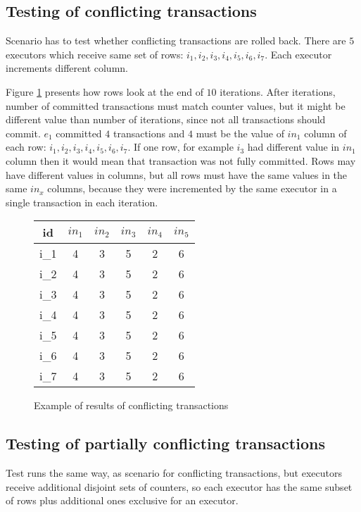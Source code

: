\subsection{Testing of conflicting transactions}
Scenario has to test whether conflicting transactions are rolled back. 
There are $5$ executors which receive same set of rows: $i_1, i_2, i_3, i_4, i_5, i_6, i_7$. Each executor increments different column. 

Figure \ref{fig:exampleConflictingTransactions} presents how rows look at the end of $10$ iterations.
After iterations, number of committed transactions must match counter values, but it might be different value than number of iterations, since not all transactions should commit. $e_1$ committed $4$ transactions and $4$ must be the value of $in_1$ column of each row: $i_1, i_2, i_3, i_4, i_5, i_6, i_7$. If one row, for example $i_3$ had different value in $in_1$ column then it would mean that transaction was not fully committed.
Rows may have different values in columns, but all rows must have the same values in the same $in_{x}$ columns, because they were incremented by the same executor in a single transaction in each iteration.


\begin{figure}[h]
\centering
\begin{tabular}{c||c|c|c|c|c}
        \toprule
        id & $in_{1}$ & $in_{2}$ & $in_{3}$ & $in_{4}$ & $in_{5}$ \\ \midrule
        i_1 &   4        & 3        & 5        &  2       & 6        \\
        i_2 &   4        & 3        & 5        &  2       & 6         \\ 
        i_3 &   4        & 3        & 5        &  2       & 6         \\ 
        i_4 &   4        & 3        & 5        &  2       & 6         \\ 
        i_5 &   4        & 3        & 5        &  2       & 6         \\ 
        i_6 &   4        & 3        & 5        &  2       & 6         \\ 
        i_7 &   4        & 3        & 5        &  2       & 6         \\  \bottomrule
      \end{tabular}
      \caption{Example of results of conflicting transactions}
  \label{fig:exampleConflictingTransactions}
\end{figure}

\subsection{Testing of partially conflicting transactions}
Test runs the same way, as scenario for conflicting transactions, but executors receive additional disjoint sets of counters, so each executor has the same subset of rows plus additional ones exclusive for an executor. 

